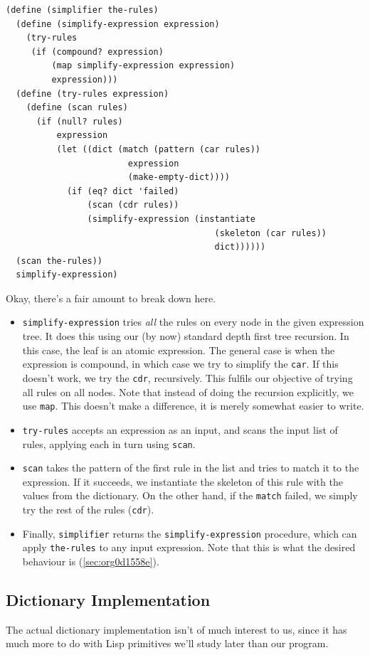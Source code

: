\documentclass[9pt]{report}
\begin{document}
\begin{verbatim}
(define (simplifier the-rules)
  (define (simplify-expression expression)
    (try-rules
     (if (compound? expression)
         (map simplify-expression expression)
         expression)))
  (define (try-rules expression)
    (define (scan rules)
      (if (null? rules)
          expression
          (let ((dict (match (pattern (car rules))
                        expression
                        (make-empty-dict))))
            (if (eq? dict 'failed)
                (scan (cdr rules))
                (simplify-expression (instantiate
                                         (skeleton (car rules))
                                         dict))))))
  (scan the-rules))
  simplify-expression)
\end{verbatim}

Okay, there's a fair amount to break down here.
\begin{itemize}
\item \texttt{simplify-expression} tries \emph{all} the rules on every node in the
given expression tree. It does this using our (by now) standard
depth first tree recursion. In this case, the leaf is an atomic
expression. The general case is when the expression is compound,
in which case we try to simplify the \texttt{car}. If this doesn't
work, we try the \texttt{cdr}, recursively. This fulfils our objective
of trying all rules on all nodes. Note that instead of doing the
recursion explicitly, we use \texttt{map}. This doesn't make a
difference, it is merely somewhat easier to write.
\item \texttt{try-rules} accepts an expression as an input, and scans the
input list of rules, applying each in turn using \texttt{scan}.
\item \texttt{scan} takes the pattern of the first rule in the list and tries
to match it to the expression. If it succeeds, we instantiate
the skeleton of this rule with the values from the dictionary.
On the other hand, if the \texttt{match} failed, we simply try the rest
of the rules (\texttt{cdr}).
\item Finally, \texttt{simplifier} returns the \texttt{simplify-expression}
procedure, which can apply \texttt{the-rules} to any input expression.
Note that this is what the desired behaviour is (\ref{sec:org0d1558e}).
\end{itemize}

\subsection{Dictionary Implementation}
\label{sec:orgd88d08c}
The actual dictionary implementation isn't of much interest to us,
since it has much more to do with Lisp primitives we'll study
later than our program.
\end{document}
